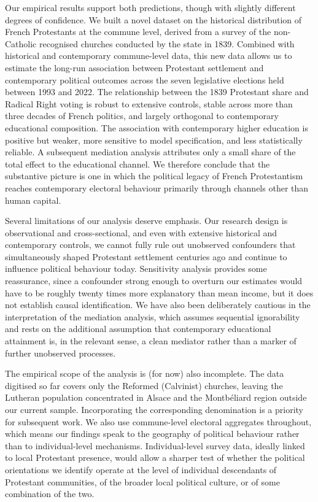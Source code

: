 \documentclass[12pt]{article}
\begin{document}
Our empirical results support both predictions, though with slightly different degrees of confidence. We built a novel dataset on the historical distribution of French Protestants at the commune level, derived from a survey of the non-Catholic recognised churches conducted by the state in 1839. Combined with historical and contemporary commune-level data, this new data allows us to estimate the long-run association between Protestant settlement and contemporary political outcomes across the seven legislative elections held between 1993 and 2022. The relationship between the 1839 Protestant share and Radical Right voting is robust to extensive controls, stable across more than three decades of French politics, and largely orthogonal to contemporary educational composition. The association with contemporary higher education is positive but weaker, more sensitive to model specification, and less statistically reliable. A subsequent mediation analysis attributes only a small share of the total effect to the educational channel. We therefore conclude that the substantive picture is one in which the political legacy of French Protestantism reaches contemporary electoral behaviour primarily through channels other than human capital.


Several limitations of our analysis deserve emphasis. Our research design is observational and cross-sectional, and even with extensive historical and contemporary controls, we cannot fully rule out unobserved confounders that simultaneously shaped Protestant settlement centuries ago and continue to influence political behaviour today. Sensitivity analysis provides some reassurance, since a confounder strong enough to overturn our estimates would have to be roughly twenty times more explanatory than mean income, but it does not establish causal identification. We have also been deliberately cautious in the interpretation of the mediation analysis, which assumes sequential ignorability and rests on the additional assumption that contemporary educational attainment is, in the relevant sense, a clean mediator rather than a marker of further unobserved processes.

The empirical scope of the analysis is (for now) also incomplete. The data digitised so far covers only the Reformed (Calvinist) churches, leaving the Lutheran population concentrated in Alsace and the Montbéliard region outside our current sample. Incorporating the corresponding denomination is a priority for subsequent work. We also use commune-level electoral aggregates throughout, which means our findings speak to the geography of political behaviour rather than to individual-level mechanisms. Individual-level survey data, ideally linked to local Protestant presence, would allow a sharper test of whether the political orientations we identify operate at the level of individual descendants of Protestant communities, of the broader local political culture, or of some combination of the two.
\end{document}
